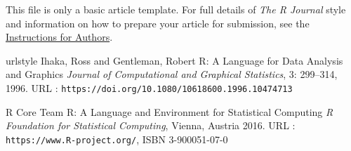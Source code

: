 This file is only a basic article template. For full details of \emph{The R Journal} style and information on how to prepare your article for submission, see the \href{https://journal.r-project.org/share/author-guide.pdf}{Instructions for Authors}.


\begin{thebibliography}{20}
    \providecommand{\natexlab}[1]{#1}
    \providecommand{\url}[1]{\texttt{#1}}
    \expandafter\ifx\csname urlstyle\endcsname\relax
      \providecommand{\doi}[1]{doi: #1}\else
      \providecommand{\doi}{doi: \begingroup \urlstyle{rm}\Url}\fi
{}
Ihaka, Ross and Gentleman, Robert
\newblock R: A Language for Data Analysis and Graphics
\newblock \emph{Journal of Computational and Graphical Statistics}, 3:
299--314, 1996.
\newblock URL : \url{https://doi.org/10.1080/10618600.1996.10474713}

R Core Team
\newblock R: A Language and Environment for Statistical Computing
\newblock \emph{R Foundation for Statistical Computing}, Vienna, Austria  2016.
\newblock URL : \url{https://www.R-project.org/}, ISBN 3-900051-07-0
\end{thebibliography}

\address{Author One\\
  Affiliation\\
  Address\\
  Country\\
  (ORCiD if desired)\\
}

\address{Author Two\\
  Affiliation\\
  Address\\
  Country\\
  (ORCiD if desired)\\
}

\address{Author Three\\
  Affiliation\\
  Address\\
  Country\\
  (ORCiD if desired)\\
 }
